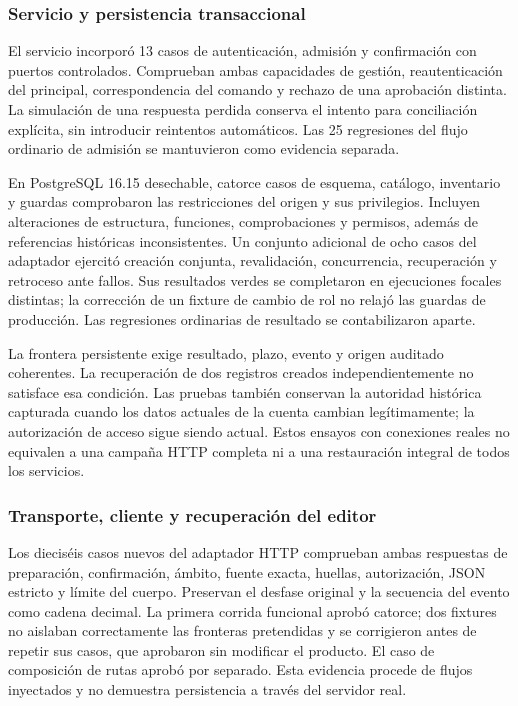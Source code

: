 \subsubsection{Servicio y persistencia transaccional}

El servicio incorporó 13 casos de autenticación, admisión y confirmación con puertos controlados. Comprueban ambas capacidades de gestión, reautenticación del principal, correspondencia del comando y rechazo de una aprobación distinta. La simulación de una respuesta perdida conserva el intento para conciliación explícita, sin introducir reintentos automáticos. Las 25 regresiones del flujo ordinario de admisión se mantuvieron como evidencia separada.

En PostgreSQL 16.15 desechable, catorce casos de esquema, catálogo, inventario y guardas comprobaron las restricciones del origen y sus privilegios. Incluyen alteraciones de estructura, funciones, comprobaciones y permisos, además de referencias históricas inconsistentes. Un conjunto adicional de ocho casos del adaptador ejercitó creación conjunta, revalidación, concurrencia, recuperación y retroceso ante fallos. Sus resultados verdes se completaron en ejecuciones focales distintas; la corrección de un fixture de cambio de rol no relajó las guardas de producción. Las regresiones ordinarias de resultado se contabilizaron aparte.

La frontera persistente exige resultado, plazo, evento y origen auditado coherentes. La recuperación de dos registros creados independientemente no satisface esa condición. Las pruebas también conservan la autoridad histórica capturada cuando los datos actuales de la cuenta cambian legítimamente; la autorización de acceso sigue siendo actual. Estos ensayos con conexiones reales no equivalen a una campaña HTTP completa ni a una restauración integral de todos los servicios.

\subsubsection{Transporte, cliente y recuperación del editor}

Los dieciséis casos nuevos del adaptador HTTP comprueban ambas respuestas de preparación, confirmación, ámbito, fuente exacta, huellas, autorización, JSON estricto y límite del cuerpo. Preservan el desfase original y la secuencia del evento como cadena decimal. La primera corrida funcional aprobó catorce; dos fixtures no aislaban correctamente las fronteras pretendidas y se corrigieron antes de repetir sus casos, que aprobaron sin modificar el producto. El caso de composición de rutas aprobó por separado. Esta evidencia procede de flujos inyectados y no demuestra persistencia a través del servidor real.

